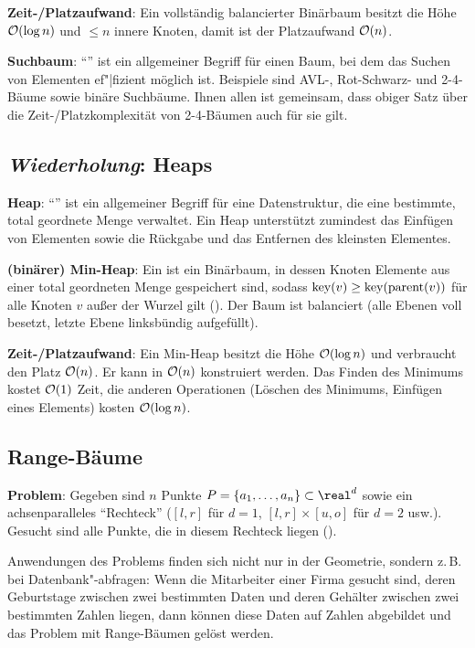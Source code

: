 \textbf{Zeit-/Platzaufwand}:
Ein vollständig balancierter Binärbaum besitzt die Höhe $\mathcal{O}(\log n)$
und $\le n$ innere Knoten, damit ist der Platzaufwand $\mathcal{O}(n)$.

\linie

\textbf{Suchbaum}:
"`"' ist ein allgemeiner Begriff für einen Baum, bei dem das Suchen von Elementen
ef"|fizient möglich ist.
Beispiele sind AVL-, Rot-Schwarz- und 2-4-Bäume sowie binäre Suchbäume.
Ihnen allen ist gemeinsam, dass obiger Satz über die Zeit-/Platzkomplexität von 2-4-Bäumen
auch für sie gilt.

\subsection{%
    \emph{Wiederholung}: Heaps%
}

\textbf{Heap}:
"`"' ist ein allgemeiner Begriff für eine Datenstruktur, die eine bestimmte,
total geordnete Menge verwaltet.
Ein Heap unterstützt zumindest das Einfügen von Elementen sowie
die Rückgabe und das Entfernen des kleinsten Elementes.

\textbf{(binärer) Min-Heap}:
Ein  ist ein Binärbaum, in dessen Knoten Elemente aus einer
total geordneten Menge gespeichert sind, sodass
$\text{key}(v) \ge \text{key}(\operatorname{parent}(v))$ für alle Knoten $v$ außer der Wurzel gilt
().
Der Baum ist balanciert
(alle Ebenen voll besetzt, letzte Ebene linksbündig aufgefüllt).

\textbf{Zeit-/Platzaufwand}:
Ein Min-Heap besitzt die Höhe $\mathcal{O}(\log n)$ und verbraucht den Platz $\mathcal{O}(n)$.
Er kann in $\mathcal{O}(n)$ konstruiert werden.
Das Finden des Minimums kostet $\mathcal{O}(1)$ Zeit,
die anderen Operationen (Löschen des Minimums, Einfügen eines Elements) kosten $\mathcal{O}(\log n)$.

\pagebreak

\subsection{%
    Range-Bäume%
}

\textbf{Problem}:
Gegeben sind $n$ Punkte $P = \{a_1, \dotsc, a_n\} \subset \real^d$ sowie ein
achsenparalleles "`Rechteck"' ($[l, r]$ für $d = 1$, $[l, r] \times [u, o]$ für $d = 2$ usw.).\\
Gesucht sind alle Punkte, die in diesem Rechteck liegen
().

Anwendungen des Problems finden sich nicht nur in der Geometrie, sondern z.\,B. bei
Datenbank"-abfragen:
Wenn die Mitarbeiter einer Firma gesucht sind, deren Geburtstage zwischen zwei bestimmten Daten und
deren Gehälter zwischen zwei bestimmten Zahlen liegen, dann können diese Daten auf Zahlen
abgebildet und das Problem mit Range-Bäumen gelöst werden.

